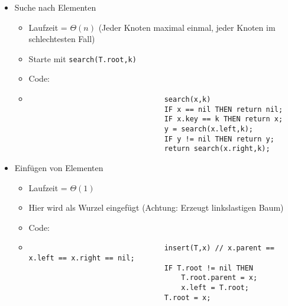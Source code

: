 \begin{itemize}
\begin{itemize}
                    \item Suche nach Elementen
                        \begin{itemize}
                            \item Laufzeit = $\Theta(n)$ (Jeder Knoten maximal einmal, jeder Knoten im schlechtesten Fall)
                            \item Starte mit \texttt{search(T.root,k)}
                            \item Code:
                            \item[]
                                \begin{verbatim}
                                search(x,k)
                                IF x == nil THEN return nil;
                                IF x.key == k THEN return x;
                                y = search(x.left,k);
                                IF y != nil THEN return y;
                                return search(x.right,k);
                                \end{verbatim}
                        \end{itemize}

                    \item Einfügen von Elementen
                        \begin{itemize}
                            \item Laufzeit = $\Theta(1)$ 
                            \item Hier wird als Wurzel eingefügt (Achtung: Erzeugt linkslastigen Baum)
                            \item Code:
                            \item[]
                                \begin{verbatim}
                                insert(T,x) // x.parent == x.left == x.right == nil;
                                IF T.root != nil THEN 
                                    T.root.parent = x;
                                    x.left = T.root;
                                T.root = x;
                                \end{verbatim}
                        \end{itemize}


\end{itemize}
\end{itemize}
